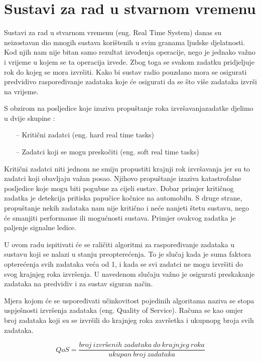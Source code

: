 \documentclass[../zavrsni.tex]{subfiles}
\begin{document}
\section{Sustavi za rad u stvarnom vremenu}

Sustavi za rad u stvarnom vremenu (eng. Real Time System) danas su neizostavan dio mnogih sustava korištenih u svim
granama ljudske djelatnosti. Kod njih nam nije bitan samo rezultat izvođenja operacije, nego je jednako važno 
i vrijeme u kojem se ta operacija izvede. Zbog toga se svakom zadatku pridjeljuje rok do kojeg se mora izvršiti.
Kako bi sustav radio pouzdano mora se osigurati predvidivo raspoređivanje zadataka koje će osigurati da se što više 
zadataka izvrši na vrijeme.

S obzirom na posljedice koje izaziva propuštanje roka izvršavanjazadatke djelimo u dvije skupine :
\begin{itemize}
    \item[--] Kritični zadatci (eng. hard real time tasks)
    \item[--] Zadatci koji se mogu preskočiti (eng. soft real time tasks)
\end{itemize}
Kritični zadatci niti jednom ne smiju propustiti krajnji rok izvršavanja jer su to zadatci koji obavljaju važan posao. Njihovo 
propuštanje izaziva katastrofalne posljedice koje mogu biti pogubne za cijeli sustav. Dobar primjer kritičnog zadatka je detekcija 
pritiska papučice kočnice na automobilu. S druge strane, propuštanje nekih zadataka
nam nije kritično i neće nanjeti štetu sustavu, nego će smanjiti performanse ili mogućnosti sustava. Primjer ovakvog zadatka je 
paljenje signalne ledice.

U ovom radu ispitivati će se raličiti algoritmi za raspoređivanje zadataka u sustavu koji se nalazi u stanju preopterećenja.
To je slučaj kada je suma faktora opterećenja svih zadataka veća od 1, i kada se svi zadatci ne mogu izvršiti do svog krajnjeg roka 
izvršenja. U navedenom slučaju važno je osigurati preskakanje zadataka na predvidiv i za sustav siguran način.

Mjera kojom će se uspoređivati učinkovitost pojedinih algoritama naziva se stopa uspješnosti izvršenja zadataka (eng. Quality of Service).
Računa se kao omjer broj zadataka koji su se izvršili do krajnjeg roka završetka i ukupnopg broja svih zadataka.

\begin{equation*}
    QoS = \frac{broj\ izvršenih\ zadataka\ do\ krajnjeg\ roka}{ukupan\ broj\ zadataka}
\end{equation*}
\end{document}

